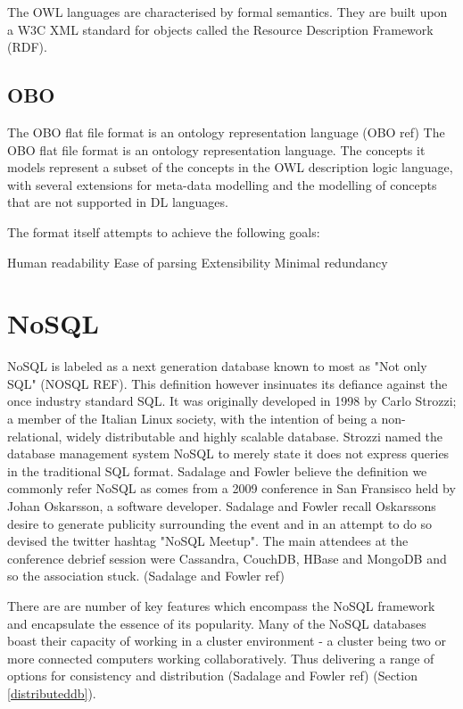The OWL languages are characterised by formal semantics. They are built upon a W3C XML standard for objects called the Resource Description Framework (RDF).

\subsection{OBO}\label{obo}
The OBO flat file format is an ontology representation language (OBO ref) The OBO flat file format is an ontology representation language. The concepts it models represent a subset of the concepts in the OWL description logic language, with several extensions for meta-data modelling and the modelling of concepts that are not supported in DL languages.

The format itself attempts to achieve the following goals:

Human readability
Ease of parsing
Extensibility
Minimal redundancy


\section{NoSQL}\label{nosql}
NoSQL is labeled as a next generation database known to most as "Not only SQL" (NOSQL REF). This definition however insinuates its defiance against the once industry standard SQL. It was originally developed in 1998 by Carlo Strozzi; a member of the Italian Linux society, with the intention of being a non-relational, widely distributable and highly scalable database. Strozzi named the database management system NoSQL to merely state it does not express queries in the traditional SQL format. Sadalage and Fowler believe the definition we commonly refer NoSQL as comes from a 2009 conference in San Fransisco held by Johan Oskarsson, a software developer. Sadalage and Fowler recall Oskarssons desire to generate publicity surrounding the event and in an attempt to do so devised the twitter hashtag "NoSQL Meetup". The main attendees at the conference debrief session were Cassandra, CouchDB, HBase and MongoDB and so the association stuck. (Sadalage and Fowler ref)

There are are number of key features which encompass the NoSQL framework and encapsulate the essence of its popularity. Many of the NoSQL databases boast their capacity of working in a cluster environment - a cluster being two or more connected computers working collaboratively. Thus delivering a range of options for consistency and distribution (Sadalage and Fowler ref) (Section \ref{distributeddb}).

